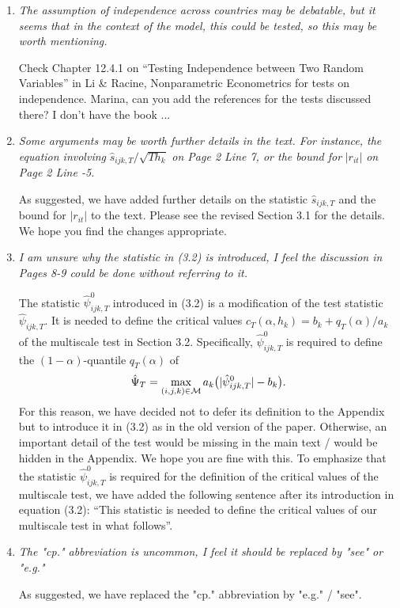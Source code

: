 \documentclass[a4paper,12pt]{article}
\begin{document}
\begin{enumerate}[label=(\arabic*),leftmargin=0.7cm]


\item \textit{The assumption of independence across countries may be debatable, but it seems that in the context of the model, this could be tested, so this may be worth mentioning.}

{\color{red} Check Chapter 12.4.1 on ``Testing Independence between Two Random Variables'' in Li \& Racine, Nonparametric Econometrics for tests on independence. Marina, can you add the references for the tests discussed there? I don't have the book ...} 


\item \textit{Some arguments may be worth further details in the text. For instance, the equation involving} $\hat{s}_{ijk,T} / \sqrt{T h_k}$ \textit{on Page 2 Line 7, or the bound for} $|r_{it}|$ \textit{on Page 2 Line -5.}

As suggested, we have added further details on the statistic $\hat{s}_{ijk,T}$ and the bound for $|r_{it}|$ to the text. Please see the revised Section 3.1 for the details. We hope you find the changes appropriate.  


\item \textit{I am unsure why the statistic in (3.2) is introduced, I feel the discussion in Pages 8-9 could be done without referring to it.}

The statistic $\hat{\psi}_{ijk,T}^0$ introduced in (3.2) is a modification of the test statistic $\hat{\psi}_{ijk,T}$. It is needed to define the critical values $c_T(\alpha,h_k) = b_k + q_T(\alpha) / a_k$ of the multiscale test in Section 3.2. Specifically, $\hat{\psi}_{ijk,T}^0$ is required to define the $(1-\alpha)$-quantile $q_T(\alpha)$ of 
\[ \hat{\Psi}_T = \max_{(i,j,k) \in \mathcal{M}} a_k \big( |\hat{\psi}_{ijk,T}^0| - b_k \big). \]
For this reason, we have decided not to defer its definition to the Appendix but to introduce it in (3.2) as in the old version of the paper. Otherwise, an important detail of the test would be missing in the main text / would be hidden in the Appendix. We hope you are fine with this. To emphasize that the statistic $\hat{\psi}_{ijk,T}^0$ is required for the definition of the critical values of the multiscale test, we have added the following sentence after its introduction in equation (3.2): ``This statistic is needed to define the critical values of our multiscale test in what follows''.


\item \textit{The "cp." abbreviation is uncommon, I feel it should be replaced by "see" or "e.g."}

As suggested, we have replaced the "cp." abbreviation by "e.g." / "see".
 

\end{enumerate}



\newpage

{\small
\setlength{\bibsep}{0.45em}
}
\end{document}
